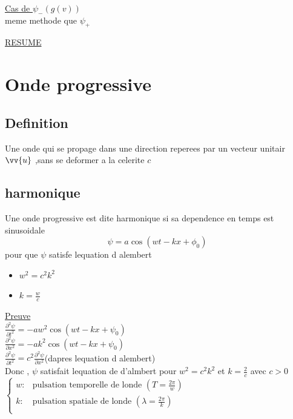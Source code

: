 \documentclass[12pt]{book}
\begin{document}
                \underline{Cas de $\psi_-(g(v))$}\\ 
                meme methode que $\psi_+$
                \begin{center} 
                    \underline{RESUME} \\
                \end{center}
        \section{Onde progressive}
            \subsection{Definition}
                Une onde qui se propage dans une direction reperees par un vecteur unitair $\vv{u}$ ,sans se deformer a la celerite $c$
            \subsection{harmonique}
                Une onde progressive est dite harmonique si sa dependence en temps est sinusoidale \\
                $$  \psi = a\cos(wt-kx+\phi_0)  $$ 
                pour que $\psi$ satisfe lequation d alembert \begin{itemize}
                    \item $w^2 = c^2k^2$
                    \item $k = \frac{w}{c}$
                \end{itemize}
                \underline{Preuve} \\
                $\frac{\partial^2 \psi}{\partial t^2} = -aw^2\cos(wt-kx+\psi_0)$\\
                $\frac{\partial^2 \psi}{\partial x^2} = -ak^2\cos(wt-kx+\psi_0)$\\
                $\frac{\partial^2 \psi}{\partial t^2} = c^2\frac{\partial^2\psi}{\partial x^2}$(dapres lequation d alembert) \\
                Donc , $\psi$ satisfait lequation de d'almbert pour $w^2=c^2k^2$ et $k=\frac{2}{c}$ avec $c > 0$\\
                $\begin{cases}
                    w : &\text{pulsation temporelle de londe }(T=\frac{2\pi}{w}) \\
                    k : &\text{pulsation spatiale de londe }(\lambda=\frac{2\pi}{k}) \\
                \end{cases}$
\end{document}
